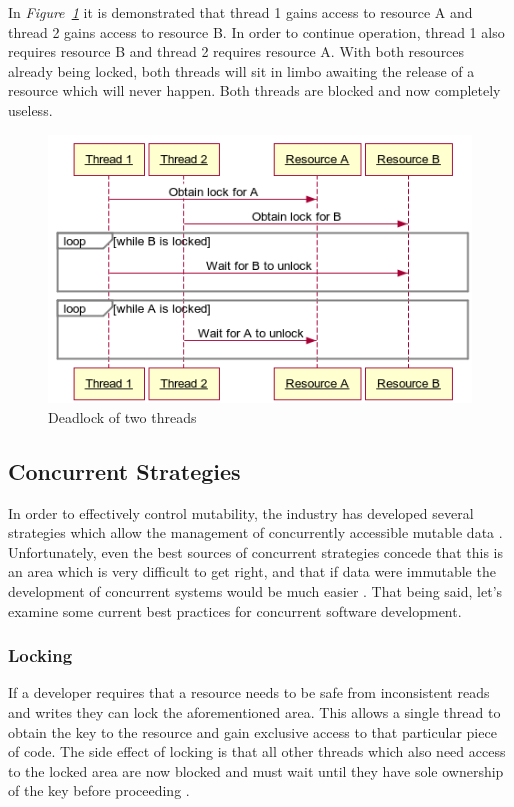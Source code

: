 \documentclass[12pt,a4paper]{article}
\begin{document}
In \textit{Figure~\ref{fig:deadlock1}} it is demonstrated that thread 1 gains access to resource A and thread 2 gains access to resource B. In order to continue operation, thread 1 also requires resource B and thread 2 requires resource A. With both resources already being locked, both threads will sit in limbo awaiting the release of a resource which will never happen. Both threads are blocked and now completely useless.
\begin{figure}[h]
  \centering
  \includegraphics[scale=.65]{deadlock1}
  \caption{Deadlock of two threads}
  \label{fig:deadlock1}
\end{figure}

\subsection{Concurrent Strategies}

In order to effectively control mutability, the industry has developed several strategies which allow the management of concurrently accessible mutable data \cite{javaConcurrency}. Unfortunately, even the best sources of concurrent strategies concede that this is an area which is very difficult to get right, and that if data were immutable the development of concurrent systems would be much easier \cite{javaConcurrency,theConcurrencyChallenge}. That being said, let's examine some current best practices for concurrent software development.

\subsubsection{Locking}

If a developer requires that a resource needs to be safe from inconsistent reads and writes they can lock the aforementioned area. This allows a single thread to obtain the key to the resource and gain exclusive access to that particular piece of code. The side effect of locking is that all other threads which also need access to the locked area are now blocked and must wait until they have sole ownership of the key before proceeding \cite{javaConcurrency}.
\end{document}

